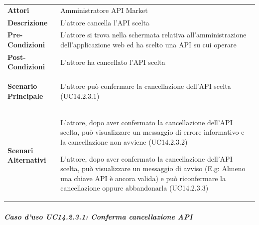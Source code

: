 \begin{minipage}{\linewidth}
	\begin{tabular}{ l | p{11cm}}
		\hline
		\rowcolor{Gray}
		\multicolumn{2}{c}{UC14.2.3 - Cancellazione API} \\
		\hline
		\textbf{Attori} & Amministratore API Market \\
		\textbf{Descrizione} & L'attore cancella l'API scelta \\
		\textbf{Pre-Condizioni} & L'attore si trova nella schermata relativa all'amministrazione dell'applicazione web ed ha scelto una API su cui operare \\
		\textbf{Post-Condizioni} & L'attore ha cancellato l'API scelta \\
		\textbf{Scenario Principale} & 
		\begin{enumerate*}[label=(\arabic*.),itemjoin={\newline}]
			\item L'attore può confermare la cancellazione dell'API scelta (UC14.2.3.1)
		\end{enumerate*}\\
		\textbf{Scenari Alternativi} & 
		\begin{enumerate*}[label=(\arabic*.),itemjoin={\newline}]
			\item L'attore, dopo aver confermato la cancellazione dell'API scelta, può visualizzare un messaggio di errore informativo e la cancellazione non avviene (UC14.2.3.2)
			\item L'attore, dopo aver confermato la cancellazione dell'API scelta, può visualizzare un messaggio di avviso (E.g: Almeno una chiave API è ancora valida) e può riconfermare la cancellazione oppure abbandonarla (UC14.2.3.3)
		\end{enumerate*}\\
	\end{tabular}
\end{minipage}

\subparagraph{Caso d'uso UC14.2.3.1: Conferma cancellazione API}
\label{UC14_2_3_1}

